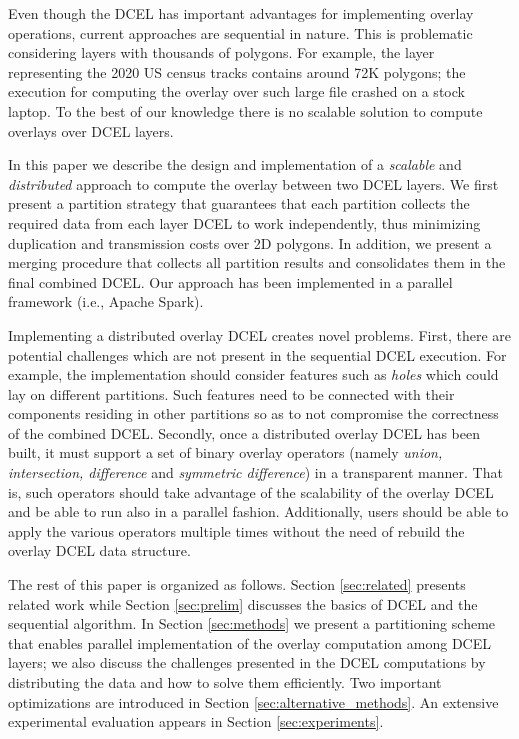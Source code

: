 Even though the DCEL has important advantages for implementing overlay operations, current approaches are sequential in nature.
This is problematic considering layers with thousands of polygons. For example, the layer representing the 2020 US census tracks contains around 72K polygons;
the execution for computing the overlay over such large file crashed on a stock laptop. To the best of our knowledge there is no scalable solution to compute
overlays over DCEL layers.

In this paper we describe the design and implementation of a \textit{scalable} and \textit{distributed} approach to compute the overlay between two DCEL layers.
We first present a partition strategy that guarantees that each partition collects the required data from each layer DCEL to work independently, thus minimizing
duplication and transmission costs over 2D polygons.
In addition, we present a merging procedure that collects all partition results and consolidates them in the final combined DCEL.
Our approach has been implemented in a parallel framework (i.e., Apache Spark).

Implementing a distributed overlay DCEL creates novel problems.
First, there are potential challenges which are not present in the sequential DCEL execution.
For example, the implementation should consider features such as \textit{holes} which could lay on different partitions.
Such features need to be connected with their components residing in other partitions so as to not compromise the correctness of the combined DCEL.
Secondly, once a distributed overlay DCEL has been built, it must support a set of binary overlay operators (namely \textit{union, intersection, difference} and
\textit{symmetric difference}) in a transparent manner.
That is, such operators should take advantage of the scalability of the overlay DCEL and be able to run also in a parallel fashion.
Additionally, users should be able to apply the various operators multiple times without the need of rebuild the overlay DCEL data structure.

The rest of this paper is organized as follows. Section \ref{sec:related} presents related work while Section \ref{sec:prelim} discusses the basics of DCEL and
the sequential algorithm.
In Section \ref{sec:methods} we present a partitioning scheme that enables parallel implementation of the overlay computation among DCEL layers; we also discuss
the challenges presented in the DCEL computations by distributing the data and how to solve them efficiently.
Two important optimizations are introduced in Section \ref{sec:alternative_methods}.
An extensive experimental evaluation appears in Section \ref{sec:experiments}.


